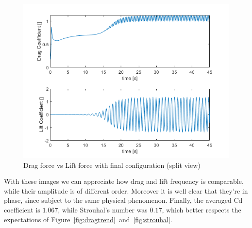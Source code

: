 \documentclass[12pt]{article}
\begin{document}
            \begin{figure}[!ht]
                \includegraphics[width=\textwidth]{drag_vs_lift_2_Federica.png}
                \centering
                \caption{Drag force vs Lift force with final configuration (split view)}
                \label{fig:drag_vsl2}
        \end{figure}
        
        With these images we can appreciate how drag and lift frequency is comparable, while their amplitude is of different order. Moreover it is well clear that they're in phase, since subject to the same physical phenomenon. Finally, the averaged Cd coefficient is $1.067$, while Strouhal's number was $0.17$, which better respects the expectations of Figure~\ref{fig:dragtrend}~and~\ref{fig:strouhal}.



\end{document}
